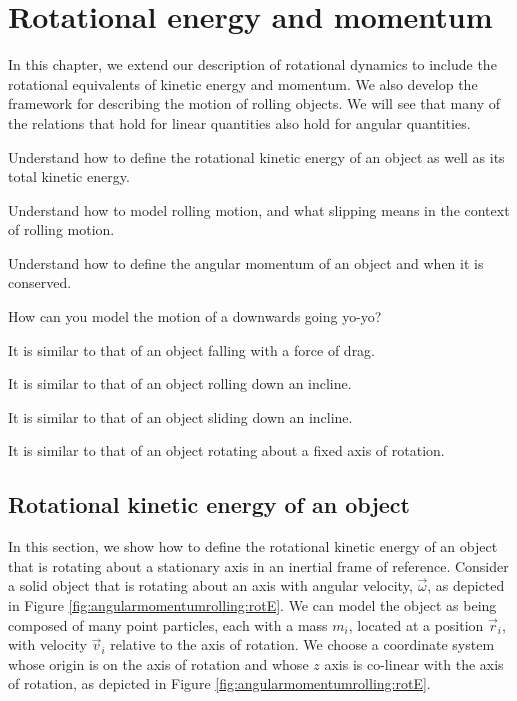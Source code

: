 
\chapter{Rotational energy and momentum}
\label{chapter:angularmomentumrolling}
In this chapter, we extend our description of rotational dynamics to include the rotational equivalents of kinetic energy and momentum. We also develop the framework for describing the motion of rolling objects. We will see that many of the relations that hold for linear quantities also hold for angular quantities. 

\begin{learningObjectives}{
 \item Understand how to define the rotational kinetic energy of an object as well as its total kinetic energy.
 \item Understand how to model rolling motion, and what slipping means in the context of rolling motion.
 \item Understand how to define the angular momentum of an object and when it is conserved.
 }
\end{learningObjectives}

\begin{opening}
\begin{MCquestion}{How can you model the motion of a downwards going yo-yo?}
\item It is similar to that of an object falling with a force of drag.
\item It is similar to that of an object rolling down an incline. \correct
\item It is similar to that of an object sliding down an incline.
\item It is similar to that of an object rotating about a fixed axis of rotation.
\end{MCquestion}
\end{opening}

\section{Rotational kinetic energy of an object}
In this section, we show how to define the rotational kinetic energy of an object that is rotating about a stationary axis in an inertial frame of reference. Consider a solid object that is rotating about an axis with angular velocity, $\vec\omega$, as depicted in Figure \ref{fig:angularmomentumrolling:rotE}.
We can model the object as being composed of many point particles, each with a mass $m_i$, located at a position $\vec r_i$, with velocity $\vec v_i$ relative to the axis of rotation. We choose a coordinate system whose origin is on the axis of rotation and whose $z$ axis is co-linear with the axis of rotation, as depicted in Figure \ref{fig:angularmomentumrolling:rotE}.

